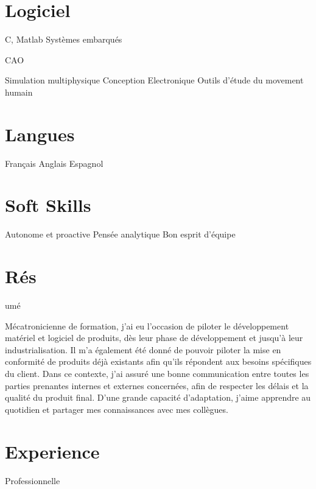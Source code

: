 \documentclass{cv-style}     %
\begin{document}
\begin{aside}
    \section{Logiciel}
    C, Matlab
    Systèmes embarqués %

    CAO %
    
    Simulation multiphysique %
    Conception Electronique %
    Outils d’étude du movement humain %
    \section{Langues}
    Français 
    Anglais 
    Espagnol
    \section{Soft Skills}
    Autonome et proactive
    Pensée analytique
    Bon esprit d'équipe
\end{aside}

\section{Rés}{umé}

Mécatronicienne de formation, j’ai eu l’occasion de piloter le développement matériel et logiciel de produits, 
dès leur phase de développement et jusqu'à leur industrialisation. Il m'a également été donné de pouvoir piloter la mise en conformité de produits 
déjà existants afin qu'ils répondent aux besoins spécifiques du client.
Dans ce contexte, j'ai assuré une bonne communication entre toutes les parties prenantes internes et externes concernées, 
afin de respecter les délais et la qualité du produit final.
D'une grande capacité d'adaptation, j’aime apprendre au quotidien et partager mes connaissances avec mes collègues.


\section{Experience}{ Professionnelle}
\end{document}
